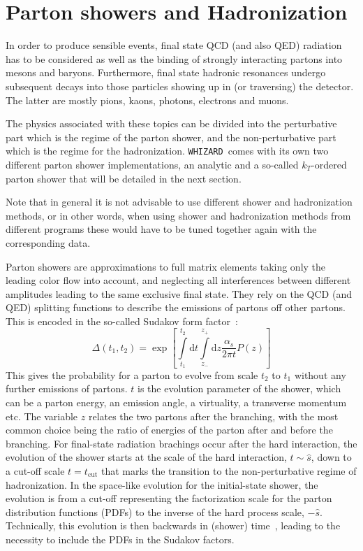 \documentclass[12pt]{book}
\newcommand{\ttt}[1]{\texttt{#1}}
\newcommand{\whizard}{\ttt{WHIZARD}}
\begin{document}
\section{Parton showers and Hadronization}

In order to produce sensible events, final state QCD (and also QED)
radiation has to be considered as well as the binding of strongly
interacting partons into mesons and baryons. Furthermore, final state
hadronic resonances undergo subsequent decays into those particles
showing up in (or traversing) the detector. The latter are mostly
pions, kaons, photons, electrons and muons.

The physics associated with these topics can be divided into the
perturbative part which is the regime of the parton shower, and the
non-perturbative part which is the regime for the
hadronization. \whizard\ comes with its own two different parton
shower implementations, an analytic and a so-called $k_T$-ordered
parton shower that will be detailed in the next section.

Note that in general it is not advisable to use different shower and
hadronization methods, or in other words, when using shower and
hadronization methods from different programs these would have to be
tuned together again with the corresponding data.

Parton showers are approximations to full matrix elements taking only
the leading color flow into account, and neglecting all interferences
between different amplitudes leading to the same exclusive final
state. They rely on the QCD (and QED) splitting functions to describe
the emissions of partons off other partons. This is encoded in the
so-called Sudakov form factor~\cite{Sudakov:1954sw}:
\begin{equation*}
  \Delta( t_1, t_2) = \exp \left[ \int\limits_{t_1}^{t_2} \mbox{d} t
    \int\limits_{z_-}^{z_+} \mbox{d} z \frac{\alpha_s}{2 \pi t} P(z)
    \right]
\end{equation*}
This gives the probability for a parton to evolve from scale $t_2$ to
$t_1$ without any further emissions of partons. $t$ is the evolution
parameter of the shower, which can be a parton energy, an emission
angle, a virtuality, a transverse momentum etc. The variable $z$
relates the two partons after the branching, with the most common
choice being the ratio of energies of the parton after and before the
branching. For final-state radiation brachings occur after the hard
interaction, the evolution of the shower starts at the scale of the
hard interaction, $t \sim \hat{s}$, down to a cut-off scale $t =
t_{\text{cut}}$ that marks the transition to the non-perturbative
regime of hadronization. In the space-like evolution for the
initial-state shower, the evolution is from a cut-off representing the
factorization scale for the parton distribution functions (PDFs) to the
inverse of the hard process scale, $-\hat{s}$. Technically, this
evolution is then backwards in (shower) time~\cite{Sjostrand:1985xi},
leading to the necessity to include the PDFs in the Sudakov factors.
\end{document}

